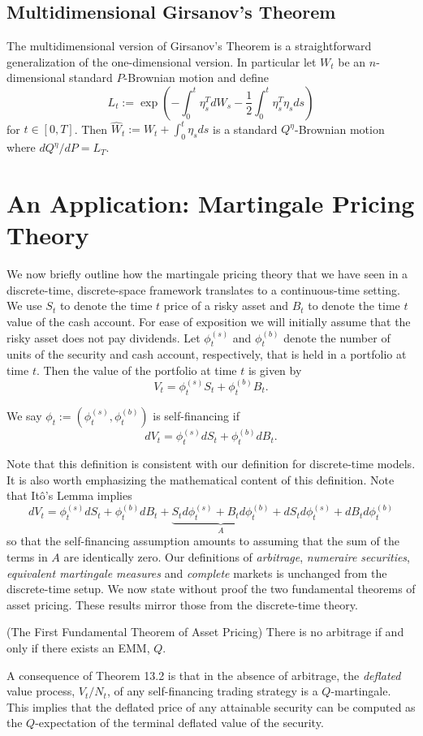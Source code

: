 \subsection{Multidimensional Girsanov's Theorem}
The multidimensional version of Girsanov's Theorem is a straightforward generalization of the one-dimensional version. In particular let $W_t$ be an $n$-dimensional standard $P$-Brownian motion and define
\[L_t := \exp\left(-\int_0^t \eta_s^T dW_s - \frac{1}{2}\int_0^t \eta_s^T \eta_s ds\right)\]
for $t\in[0,T]$. Then $\widehat{W}_t:=W_t+\int_0^t \eta_s ds$ is a standard $Q^\eta$-Brownian motion where $dQ^\eta/dP=L_T$.

\section{An Application: Martingale Pricing Theory}
We now briefly outline how the martingale pricing theory that we have seen in a discrete-time, discrete-space framework translates to a continuous-time setting. We use $S_t$ to denote the time $t$ price of a risky asset and $B_t$ to denote the time $t$ value of the cash account. For ease of exposition we will initially assume that the risky asset does not pay dividends. Let $\phi_t^{(s)}$ and $\phi_t^{(b)}$ denote the number of units of the security and cash account, respectively, that is held in a portfolio at time $t$. Then the value of the portfolio at time $t$ is given by
\[V_t = \phi_t^{(s)} S_t + \phi_t^{(b)} B_t.\]

\begin{definition}
We say $\phi_t:=(\phi_t^{(s)},\phi_t^{(b)})$ is self-financing if
\[dV_t = \phi_t^{(s)} dS_t + \phi_t^{(b)} dB_t.\]
\end{definition}
Note that this definition is consistent with our definition for discrete-time models. It is also worth emphasizing the mathematical content of this definition. Note that It\^o's Lemma implies
\[dV_t = \phi_t^{(s)} dS_t + \phi_t^{(b)} dB_t + \underbrace{S_t d\phi_t^{(s)} + B_t d\phi_t^{(b)}}_{A} + dS_t d\phi_t^{(s)} + dB_t d\phi_t^{(b)}\]
so that the self-financing assumption amounts to assuming that the sum of the terms in $A$ are identically zero. Our definitions of \textit{arbitrage}, \textit{numeraire securities}, \textit{equivalent martingale measures} and \textit{complete} markets is unchanged from the discrete-time setup. We now state without proof the two fundamental theorems of asset pricing. These results mirror those from the discrete-time theory.

\begin{theorem} (The First Fundamental Theorem of Asset Pricing)
There is no arbitrage if and only if there exists an EMM, $Q$.
\end{theorem}
A consequence of Theorem 13.2 is that in the absence of arbitrage, the \textit{deflated} value process, $V_t/N_t$, of any self-financing trading strategy is a $Q$-martingale. This implies that the deflated price of any attainable security can be computed as the $Q$-expectation of the terminal deflated value of the security.


